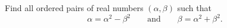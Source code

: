 Find all ordered pairs of real numbers $(\alpha,\beta)$ such that
\[
\alpha=\alpha^2-\beta^2\qquad\text{and}\qquad\beta=\alpha^2+\beta^2 .
\]
